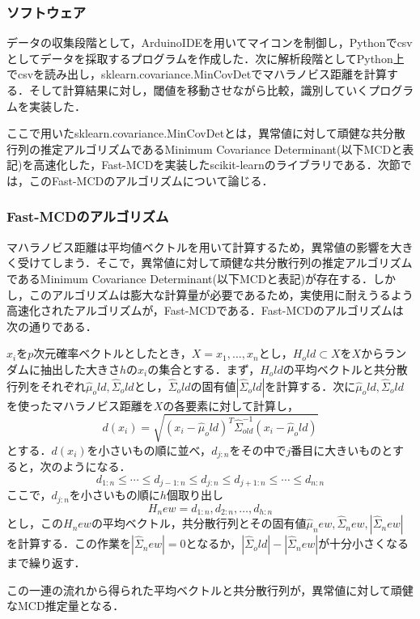 \documentclass[a4j]{jarticle}%
\begin{document}
\subsubsection{ソフトウェア}
データの収集段階として，ArduinoIDEを用いてマイコンを制御し，Pythonでcsvとしてデータを採取するプログラムを作成した．次に解析段階としてPython上でcsvを読み出し，sklearn.covariance.MinCovDetでマハラノビス距離を計算する．そして計算結果に対し，閾値を移動させながら比較，識別していくプログラムを実装した．\par
ここで用いたsklearn.covariance.MinCovDetとは，異常値に対して頑健な共分散行列の推定アルゴリズムであるMinimum Covariance Determinant(以下MCDと表記)を高速化した，Fast-MCDを実装したscikit-learnのライブラリである．次節では，このFast-MCDのアルゴリズムについて論じる．

\subsubsection{Fast-MCDのアルゴリズム}
マハラノビス距離は平均値ベクトルを用いて計算するため，異常値の影響を大きく受けてしまう．そこで，異常値に対して頑健な共分散行列の推定アルゴリズムであるMinimum Covariance Determinant(以下MCDと表記)が存在する．しかし，このアルゴリズムは膨大な計算量が必要であるため，実使用に耐えうるよう高速化されたアルゴリズムが，Fast-MCDである．Fast-MCDのアルゴリズムは次の通りである．\par
$x_i$を$p$次元確率ベクトルとしたとき，$X = {x_1, \ldots, x_n}$とし，$H_old\subset X$を$X$からランダムに抽出した大きさ$h$の$x_i$の集合とする．まず，$H_old$の平均ベクトルと共分散行列をそれぞれ$\hat{\mu}_old, \hat{\Sigma}_old$とし，$\hat{\Sigma}_old$の固有値$|\hat{\Sigma}_old|$を計算する．次に$\hat{\mu}_old, \hat{\Sigma}_old$を使ったマハラノビス距離を$X$の各要素に対して計算し，
\[
d(x_i) = \sqrt{(x_i-\hat{\mu}_old)^{T}\hat{\Sigma}_{old}^{-1}(x_i-\hat{\mu}_old)}
\]
とする．$d(x_i)$を小さいもの順に並べ，$d_{j:n}$をその中で$j$番目に大きいものとすると，次のようになる．
\[
d_{1:n}\leq \cdots\leq d_{j-1:n}\leq d_{j:n}\leq d_{j+1:n}\leq \cdots\leq d_{n:n}
\]
ここで，$d_{j:n}$を小さいもの順に$h$個取り出し
\[
H_new = {d_{1:n}, d_{2:n}, \ldots, d_{h:n}}
\]
とし，この$H_new$の平均ベクトル，共分散行列とその固有値$\hat{\mu}_new, \hat{\Sigma}_new, |\hat{\Sigma}_new|$を計算する．この作業を$|\hat{\Sigma}_new| = 0$となるか，$|\hat{\Sigma}_old|−|\hat{\Sigma}_new|$が十分小さくなるまで繰り返す．\par
この一連の流れから得られた平均ベクトルと共分散行列が，異常値に対して頑健なMCD推定量となる．
\end{document}
